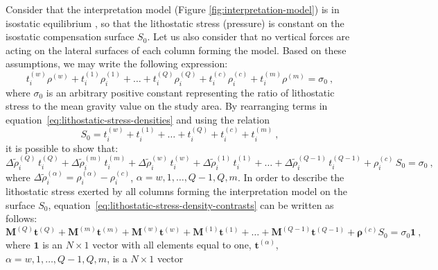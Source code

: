 \documentclass[manuscript]{geophysics}
\begin{document}
Consider that the interpretation model (Figure \ref{fig:interpretation-model})
is in isostatic equilibrium \citep{turcotte-schubert2002, hofmann-wellenhof-moritz2005, 
lowrie2007}, so that the lithostatic stress (pressure) is constant on the isostatic 
compensation surface $S_{0}$.
Let us also consider that no vertical forces are acting on the lateral surfaces of 
each column forming the model.
Based on these assumptions, we may write the following expression:
\begin{equation}
t^{(w)}_{i} \rho^{(w)} + t^{(1)}_{i} \rho^{(1)}_{i} + \dots + 
t^{(Q)}_{i} \rho^{(Q)}_{i} + t^{(c)}_{i} \rho^{(c)}_{i} + t^{(m)}_{i} \rho^{(m)} 
= \sigma_{0} \: ,
\label{eq:lithostatic-stress-densities}
\end{equation}
where $\sigma_{0}$ is an arbitrary positive constant representing the ratio of
lithostatic stress to the mean gravity value on the study area.
By rearranging terms in equation~\ref{eq:lithostatic-stress-densities} 
and using the relation
\begin{equation}
S_{0} = t^{(w)}_{i} + t^{(1)}_{i} + \dots + t^{(Q)}_{i} + t^{(c)}_{i} + t^{(m)}_{i} \: ,
\label{eq:S0}
\end{equation}
it is possible to show that:
\begin{equation}
\Delta \tilde{\rho}^{(Q)}_{i} \, t^{(Q)}_{i} + 
\Delta \tilde{\rho}^{(m)}_{i} \, t^{(m)}_{i} + 
\Delta \tilde{\rho}^{(w)}_{i} \, t^{(w)}_{i} + 
\Delta \tilde{\rho}^{(1)}_{i} \, t^{(1)}_{i} +
\dots + 
\Delta \tilde{\rho}^{(Q-1)}_{i} \, t^{(Q-1)}_{i} +
\rho^{(c)}_{i} \, S_{0} = \sigma_{0} \: ,
\label{eq:lithostatic-stress-density-contrasts}
\end{equation}
where $\Delta \tilde{\rho}^{(\alpha)}_{i} = \rho^{(\alpha)}_{i} - \rho^{(c)}_{i}$, 
$\alpha = w, 1, \dots, Q-1, Q, m$.
In order to describe the lithostatic stress exerted by all columns forming the
interpretation model on the surface $S_{0}$, 
equation~\ref{eq:lithostatic-stress-density-contrasts} 
can be written as follows:
\begin{equation}
\mathbf{M}^{(Q)} \mathbf{t}^{(Q)} + \mathbf{M}^{(m)} \mathbf{t}^{(m)} + \mathbf{M}^{(w)}
\mathbf{t}^{(w)} + \mathbf{M}^{(1)} \mathbf{t}^{(1)} + \dots + \mathbf{M}^{(Q-1)}
\mathbf{t}^{(Q-1)} + \boldsymbol{\rho}^{(c)} S_{0} = \sigma_{0} \mathbf{1} \: ,
\label{eq:lithostatic-stress-matrix}
\end{equation}
where $\mathbf{1}$ is an $N \times 1$ vector with all elements equal to one, 
$\mathbf{t}^{(\alpha)}$, $\alpha = w, 1, \dots, Q-1, Q, m$, is a $N \times 1$ vector
\end{document}
